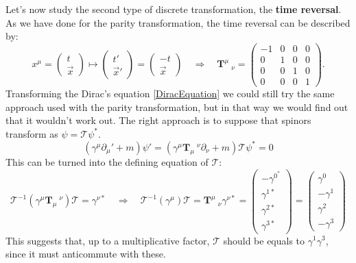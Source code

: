 Let's now study the second type of discrete transformation, the \textbf{time reversal}. As we have done for the parity transformation, the time reversal can be described by:
\begin{equation}
    \label{timeReversal}x^\mu=\begin{pmatrix}
        t\\\vec x
    \end{pmatrix}\longmapsto \begin{pmatrix}
        t'\\\vec x'
    \end{pmatrix}=\begin{pmatrix}
        -t\\\vec x
    \end{pmatrix} \quad\Rightarrow\quad \mathbf{T}  ^\mu\ _\nu=\begin{pmatrix}
        -1&0&0&0\\0&1&0&0\\0&0&1&0\\0&0&0&1
    \end{pmatrix}.
\end{equation}
Transforming the Dirac's equation \eqref{DiracEquation} we could still try the same approach used with the parity transformation, but in that way we would find out that it wouldn't work out. The right approach is to suppose that spinors transform as $\psi=\mathcal{T} \psi^*$.
\begin{equation*}
    (\gamma^\mu\partial_\mu'+m)\psi'=(\gamma^\mu\mathbf{T}  _\mu\ ^\nu\partial_\nu+m)\mathcal{T} \psi^*=0
\end{equation*}
This can be turned into the defining equation of $\mathcal{T}$:
\begin{equation*}
    \mathcal{T} ^{-1}(\gamma^\mu\mathbf{T}  _\mu\ ^\nu)\mathcal{T} =\gamma^{\nu*}\quad\Rightarrow\quad\mathcal{T} ^{-1}(\gamma^\mu)\mathcal{T} =\mathbf{T}  ^\mu\ _\nu\gamma^{\nu*}=\begin{pmatrix}
        -\gamma^{0^*}\\\gamma^{1*}\\\gamma^{2*}\\\gamma^{3*}\end{pmatrix}=\begin{pmatrix}
            \gamma^{0}\\-\gamma^{1}\\\gamma^{2}\\-\gamma^{3}
    \end{pmatrix}
\end{equation*}
This suggests  that, up to a multiplicative factor, $\mathcal{T} $ should be equals to $\gamma^1\gamma^3$, since it must anticommute with these. 
